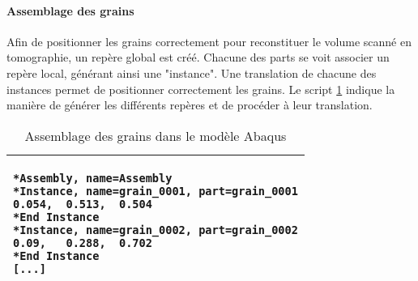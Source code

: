 \paragraph{Assemblage des grains\\}
Afin de positionner les grains correctement pour reconstituer le volume scanné en tomographie, un repère global est créé. Chacune des parts se voit associer un repère local, générant ainsi une "instance". Une translation de chacune des instances permet de positionner correctement les grains. Le script \ref{script05:assemblage} indique la manière de générer les différents repères et de procéder à leur translation.
\begin{table}[h]\centering
	\begin{tabular}{p{}}
		\hline
		\begin{lstlisting}[language={}, breaklines=true]
*Assembly, name=Assembly
*Instance, name=grain_0001, part=grain_0001
0.054,  0.513,  0.504
*End Instance
*Instance, name=grain_0002, part=grain_0002
0.09,   0.288,  0.702
*End Instance
[...]
		\end{lstlisting}\\
		\hline
	\end{tabular}
	\caption{\label{script05:assemblage}Assemblage des grains dans le modèle Abaqus}
\end{table}

